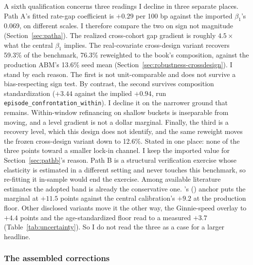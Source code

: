 \documentclass[12pt]{article}
\newcommand{\citepos}[1]{\citeauthor{#1}'s (\citeyear{#1})}
\begin{document}
A sixth qualification concerns three readings I decline in three separate places. Path A's fitted rate-gap coefficient is $+0.29$ per 100 bp against the imported $\beta_1$'s $0.069$, on different scales. I therefore compare the two on sign not magnitude (Section~\ref{sec:patha}). The realized cross-cohort gap gradient is roughly $4.5\times$ what the central $\beta_1$ implies. The real-covariate cross-design variant recovers 59.3\% of the benchmark, 76.3\% reweighted to the book's composition, against the production ABM's 13.6\% seed mean (Section~\ref{sec:robustness-crossdesign}). I stand by each reason. The first is not unit-comparable and does not survive a bias-respecting sign test. By contrast, the second survives composition standardization ($+3.44$ against the implied $+0.94$, run \texttt{episode\_confrontation\_within}). I decline it on the narrower ground that remains. Within-window refinancing on shallow buckets is inseparable from moving, and a level gradient is not a dollar marginal. Finally, the third is a recovery level, which this design does not identify, and the same reweight moves the frozen cross-design variant down to 12.6\%. Stated in one place: none of the three points toward a smaller lock-in channel. I keep the imported value for Section~\ref{sec:pathb}'s reason. Path B is a structural verification exercise whose elasticity is estimated in a different setting and never touches this benchmark, so re-fitting it in-sample would end the exercise. Among available literature estimates the adopted band is already the conservative one. \citepos{fonseca2024} anchor puts the marginal at $+11.5$ points against the central calibration's $+9.2$ at the production floor. Other disclosed variants move it the other way, the Ginnie-speed overlay to $+4.4$ points and the age-standardized floor read to a measured $+3.7$ (Table~\ref{tab:uncertainty}). So I do not read the three as a case for a larger headline.

\subsubsection{The assembled corrections}
\end{document}
